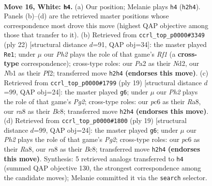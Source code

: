 \documentclass[11pt]{article}
\begin{document}
\clearpage

\begin{figure}[p]\centering
\begin{subfigure}{0.46\textwidth}\centering
\resizebox{\linewidth}{!}{%
\newchessgame
\chessboard[
  setfen={rnbqr1k1/p3b2p/2p1ppp1/1p1n4/3P4/1P1Q1BP1/P2NPPKP/RNB2R2 w - - 0 16},
  showmover=false,
  pgfstyle=straightmove, color=movearrow, markmove={h2-h4}
]}
\caption{}
\end{subfigure}\hfill
\begin{subfigure}{0.46\textwidth}\centering
\resizebox{\linewidth}{!}{%
\newchessgame
\chessboard[
  setfen={r3k2r/1bqpbppp/p1n1p3/1p1nP3/8/P2Q1NP1/1PPN1PBP/R1B2RK1 w kq - 1 12},
  showmover=false,
  pgfstyle=straightmove, color=movearrow, markmove={f1-e1}
]}
\caption{}
\end{subfigure}
\\[4pt]
\begin{subfigure}{0.46\textwidth}\centering
\resizebox{\linewidth}{!}{%
\newchessgame
\chessboard[
  setfen={r1b1kb1r/ppqpnppp/4p3/3n4/2NP4/2PB3N/PP3PPP/R1BQK2R b KQkq - 2 10},
  showmover=false,
  pgfstyle=straightmove, color=movearrow, markmove={g7-g6}
]}
\caption{}
\end{subfigure}\hfill
\begin{subfigure}{0.46\textwidth}\centering
\resizebox{\linewidth}{!}{%
\newchessgame
\chessboard[
  setfen={r1b1kb1r/ppqpnppp/4p3/3n4/2NP4/2PB3N/PP3PPP/R1BQK2R b KQkq - 2 10},
  showmover=false,
  pgfstyle=straightmove, color=movearrow, markmove={g7-g6}
]}
\caption{}
\end{subfigure}
\caption{\textbf{Move 16, White: \texttt{h4}.} (a) Our position; Melanie plays \texttt{h4} (\texttt{h2h4}). Panels (b)--(d) are the retrieved master positions whose correspondence most drove this move (highest QAP objective among those that transfer to it). (b) Retrieved from \texttt{ccrl\_top\_p0000\#3349} (ply 22) [structural distance $d$=91, QAP obj=34]: the master played \texttt{Re1}; under $\mu$ our \emph{Ph2} plays the role of that game's \emph{Rf1} (a \textbf{cross-type} correspondence); cross-type roles: our \emph{P}a2 as their \emph{N}d2, our \emph{N}b1 as their \emph{P}f2; transferred move \texttt{h2h4} \textbf{(endorses this move)}. (c) Retrieved from \texttt{ccrl\_top\_p0000\#1799} (ply 19) [structural distance $d$=99, QAP obj=24]: the master played \texttt{g6}; under $\mu$ our \emph{Ph2} plays the role of that game's \emph{Pg2}; cross-type roles: our \emph{p}c6 as their \emph{R}a8, our \emph{r}a8 as their \emph{B}c8; transferred move \texttt{h2h4} \textbf{(endorses this move)}. (d) Retrieved from \texttt{ccrl\_top\_p0000\#1800} (ply 19) [structural distance $d$=99, QAP obj=24]: the master played \texttt{g6}; under $\mu$ our \emph{Ph2} plays the role of that game's \emph{Pg2}; cross-type roles: our \emph{p}c6 as their \emph{R}a8, our \emph{r}a8 as their \emph{B}c8; transferred move \texttt{h2h4} \textbf{(endorses this move)}. Synthesis: 5 retrieved analogs transferred to \texttt{h4} (summed QAP objective 130, the strongest correspondence among the candidate moves); Melanie committed it via the \texttt{search} selector.}
\label{fig:thought-m30}
\end{figure}
\end{document}
